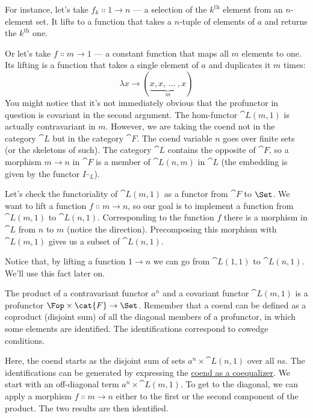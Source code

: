 \noindent
For instance, let's take $f_k \Colon 1 \to n$ --- a
selection of the $k^\text{th}$ element from an $n$-element set. It lifts to
a function that takes a $n$-tuple of elements of $a$ and returns
the $k^\text{th}$ one.

Or let's take $f \Colon m \to 1$ --- a constant
function that maps all $m$ elements to one. Its lifting is a function that
takes a single element of $a$ and duplicates it $m$ times:
\[\lambda{}x \to (\underbrace{x, x,\ ...\ , x}_{m})\]
You might notice that it's not immediately obvious that the profunctor
in question is covariant in the second argument. The hom-functor
$\cat{L}(m, 1)$ is actually contravariant in $m$. However, we
are taking the coend not in the category $\cat{L}$ but in the category
$\cat{F}$. The coend variable $n$ goes over finite sets (or the
skeletons of such). The category $\cat{L}$ contains the opposite of
$\cat{F}$, so a morphism $m \to n$ in $\cat{F}$
is a member of $\cat{L}(n, m)$ in $\cat{L}$ (the embedding is given
by the functor $I_{\cat{L}}$).

Let's check the functoriality of $\cat{L}(m, 1)$ as a functor from
$\cat{F}$ to $\Set$. We want to lift a function
$f \Colon m \to n$, so our goal is to implement a
function from $\cat{L}(m, 1)$ to $\cat{L}(n, 1)$. Corresponding to
the function $f$ there is a morphism in $\cat{L}$ from
$n$ to $m$ (notice the direction). Precomposing this
morphism with $\cat{L}(m, 1)$ gives us a subset of
$\cat{L}(n, 1)$.

\begin{figure}[H]
\centering
{}
\end{figure}

\noindent
Notice that, by lifting a function $1 \to n$ we can go
from $\cat{L}(1, 1)$ to $\cat{L}(n, 1)$. We'll use this fact later
on.

The product of a contravariant functor $a^n$ and a covariant
functor $\cat{L}(m, 1)$ is a profunctor
$\Fop \times \cat{F} \to \Set$. Remember that a coend can be defined
as a coproduct (disjoint sum) of all the diagonal members of a
profunctor, in which some elements are identified. The identifications
correspond to cowedge conditions.

Here, the coend starts as the disjoint sum of sets
$a^n \times \cat{L}(n, 1)$ over all $n$s. The identifications can
be generated by expressing the
\hyperref[ends-and-coends]{coend as
a coequalizer}. We start with an off-diagonal term
$a^n \times \cat{L}(m, 1)$. To get to the diagonal, we can apply a
morphism $f \Colon m \to n$ either to the first or
the second component of the product. The two results are then
identified.

